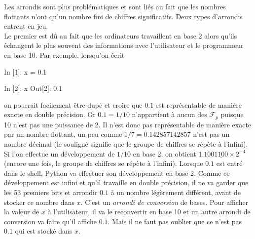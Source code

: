 \documentclass{magnolia}
\begin{document}
Les arrondis sont plus problématiques et sont liés au fait que les nombres
flottants n'ont qu'un nombre fini de chiffres significatifs. Deux types d'arrondis
entrent en jeu.\\

Le premier est dû au fait que les ordinateurs travaillent en base 2 alors qu'ils
échangent le plus souvent des informations avec l'utilisateur et le programmeur en base 10. Par exemple, lorsqu'on écrit
\begin{pythoncode}
In [1]: x = 0.1

In [2]: x
Out[2]: 0.1
\end{pythoncode}
on pourrait facilement être dupé et croire  que $0.1$ est représentable de
manière exacte en double précision. Or $0.1=1/10$ n'appartient à aucun des $\mathcal{F}_p$
puisque 10 n'est pas une puissance de 2. Il n'est donc pas représentable de manière exacte
par un nombre flottant, un peu comme $1/7=0.142857\underline{142857}$ n'est pas un nombre
décimal (le souligné signifie que le groupe de chiffres se répète à l'infini). Si l'on effectue un
développement de $1/10$ en base 2, on obtient $1.100\underline{1100} \times 2^{-4}$ (encore une fois, le groupe de chiffres se répète à l'infini).
Lorsque $0.1$ est entré dans le shell, Python va effectuer son développement en base
2. Comme ce développement est infini et qu'il travaille en double précision, il ne va garder que les 53 premiers bits
et arrondir $0.1$ à un nombre légèrement différent, avant de stocker ce nombre dans $x$. C'est un \emph{arrondi de conversion} de bases. Pour afficher
la valeur de $x$ à l'utilisateur, il va le reconvertir en base 10 et un autre arrondi de conversion
va faire qu'il affiche $0.1$. Mais il ne faut pas oublier que ce n'est pas $0.1$ qui est
stocké dans $x$.\\
\end{document}
